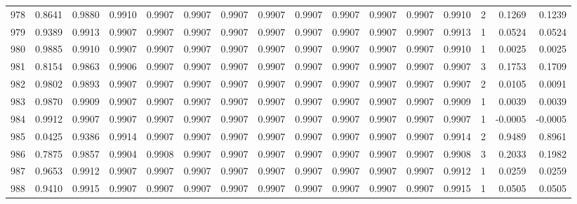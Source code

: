 \begin{tabular}{lrrrrrrrrrrrrrrr}
978 &      0.8641 &  0.9880 &  0.9910 &  0.9907 &  0.9907 &  0.9907 &  0.9907 &  0.9907 &  0.9907 &  0.9907 &   0.9907 &     0.9910 &      2 &                    0.1269 &                     0.1239 \\
979 &      0.9389 &  0.9913 &  0.9907 &  0.9907 &  0.9907 &  0.9907 &  0.9907 &  0.9907 &  0.9907 &  0.9907 &   0.9907 &     0.9913 &      1 &                    0.0524 &                     0.0524 \\
980 &      0.9885 &  0.9910 &  0.9907 &  0.9907 &  0.9907 &  0.9907 &  0.9907 &  0.9907 &  0.9907 &  0.9907 &   0.9907 &     0.9910 &      1 &                    0.0025 &                     0.0025 \\
981 &      0.8154 &  0.9863 &  0.9906 &  0.9907 &  0.9907 &  0.9907 &  0.9907 &  0.9907 &  0.9907 &  0.9907 &   0.9907 &     0.9907 &      3 &                    0.1753 &                     0.1709 \\
982 &      0.9802 &  0.9893 &  0.9907 &  0.9907 &  0.9907 &  0.9907 &  0.9907 &  0.9907 &  0.9907 &  0.9907 &   0.9907 &     0.9907 &      2 &                    0.0105 &                     0.0091 \\
983 &      0.9870 &  0.9909 &  0.9907 &  0.9907 &  0.9907 &  0.9907 &  0.9907 &  0.9907 &  0.9907 &  0.9907 &   0.9907 &     0.9909 &      1 &                    0.0039 &                     0.0039 \\
984 &      0.9912 &  0.9907 &  0.9907 &  0.9907 &  0.9907 &  0.9907 &  0.9907 &  0.9907 &  0.9907 &  0.9907 &   0.9907 &     0.9907 &      1 &                   -0.0005 &                    -0.0005 \\
985 &      0.0425 &  0.9386 &  0.9914 &  0.9907 &  0.9907 &  0.9907 &  0.9907 &  0.9907 &  0.9907 &  0.9907 &   0.9907 &     0.9914 &      2 &                    0.9489 &                     0.8961 \\
986 &      0.7875 &  0.9857 &  0.9904 &  0.9908 &  0.9907 &  0.9907 &  0.9907 &  0.9907 &  0.9907 &  0.9907 &   0.9907 &     0.9908 &      3 &                    0.2033 &                     0.1982 \\
987 &      0.9653 &  0.9912 &  0.9907 &  0.9907 &  0.9907 &  0.9907 &  0.9907 &  0.9907 &  0.9907 &  0.9907 &   0.9907 &     0.9912 &      1 &                    0.0259 &                     0.0259 \\
988 &      0.9410 &  0.9915 &  0.9907 &  0.9907 &  0.9907 &  0.9907 &  0.9907 &  0.9907 &  0.9907 &  0.9907 &   0.9907 &     0.9915 &      1 &                    0.0505 &                     0.0505 \\

\end{tabular}
